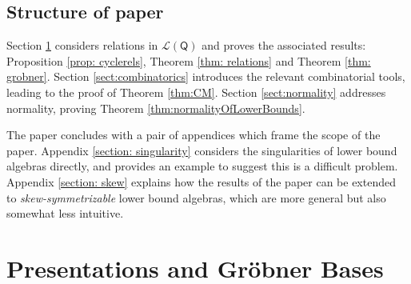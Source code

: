 \documentclass[ALCO,published]{cedram}
\numberwithin{equation}{section}
\renewcommand{\L}{\mathcal{L}}%
\newcommand{\1}{^{-1}}
\def\Q{\mathsf{Q}}
\begin{document}
\subsection*{Structure of paper}

Section \ref{section: algebra} considers relations in $\L(\Q)$ and proves the associated results: Proposition \ref{prop: cyclerels}, Theorem \ref{thm: relations} and Theorem \ref{thm: grobner}.  Section \ref{sect:combinatorics} introduces the relevant combinatorial tools, leading to the proof of Theorem \ref{thm:CM}.  Section \ref{sect:normality} addresses normality, proving Theorem \ref{thm:normalityOfLowerBounds}.  

The paper concludes with a pair of appendices which frame the scope of the paper.  Appendix \ref{section: singularity} considers the singularities of lower bound algebras directly, and provides an example to suggest this is a difficult problem.  Appendix \ref{section: skew} explains how the results of the paper can be extended to \emph{skew-symmetrizable} lower bound algebras, which are more general but also somewhat less intuitive.

\section{Presentations and Gr\"obner Bases}\label{section: algebra}
\end{document}
